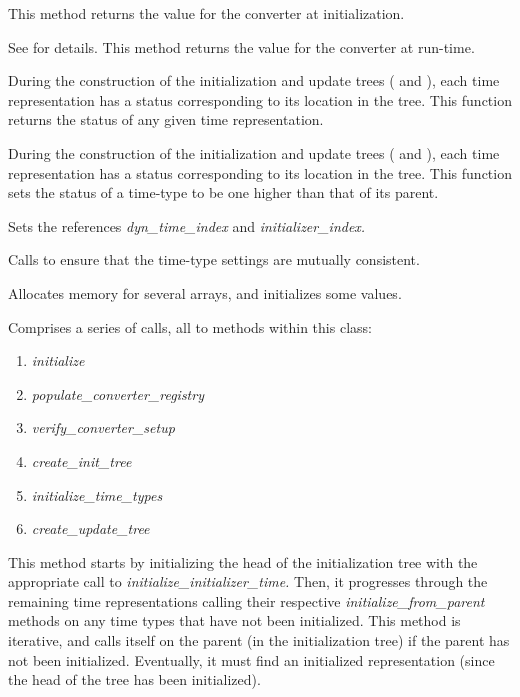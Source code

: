 {\begin{enumerate}
{\begin{enumerate}
This method returns the value for the converter at initialization.

\label{ref:getconvdirupd}
See  for details.  This 
method returns the
value for the converter at run-time.

During the construction of the initialization and update trees
( and
), each time 
representation has a status
corresponding to its location in the tree.  This function returns the
status of any given time representation.

During the construction of the initialization and update trees 
( and
), each time 
representation has a status
corresponding to its location in the tree.  This function sets the
status of a time-type to be one higher than that of its parent.

Sets the references \textit{dyn\_time\_index }and
\textit{initializer\_index.}

Calls  to ensure that the 
time-type
settings are mutually consistent.

Allocates memory for several arrays, and initializes some values.

\label{ref:initializemanager}Comprises a series of calls, all to methods
within this class:


\begin{enumerate}
\item \textit{initialize}
\item \textit{populate\_converter\_registry}
\item \textit{verify\_converter\_setup}
\item \textit{create\_init\_tree}
\item \textit{initialize\_time\_types}
\item \textit{create\_update\_tree}
\end{enumerate}


This method starts by initializing the head of the initialization tree
with the appropriate call to \textit{initialize\_initializer\_time. 
}Then, it progresses through the remaining time representations calling
their respective \textit{initialize\_from\_parent} methods on any time
types that have not been initialized.  This method is iterative, and
calls itself on the parent (in the initialization tree) if the parent
has not been initialized.  Eventually, it must find an initialized
representation (since the head of the tree has been initialized).


\end{enumerate}}
\end{enumerate}}
